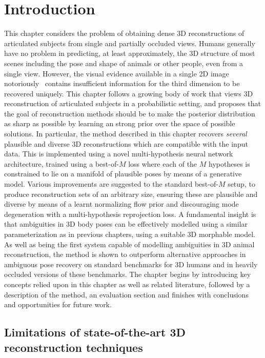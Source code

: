 \section{Introduction}\label{s:intro}

This chapter considers the problem of obtaining dense 3D reconstructions of articulated subjects from single and partially occluded views. Humans generally have no problem in predicting, at least approximately, the 3D structure of most scenes including the pose and shape of animals or other people, even from a single view.
However, the visual evidence available in a single 2D image notoriously~\citep{Faugeras01geometry} contains insufficient information for the third dimension to be recovered uniquely. 
This chapter follows a growing body of work that views 3D reconstruction of articulated subjects in a probabilistic setting, and proposes that the goal of reconstruction methods should be to make the posterior distribution as sharp as possible by learning an strong prior over the space of possible solutions. 
In particular, the method described in this chapter recovers \emph{several} plausible and diverse 3D reconstructions which are compatible with the input data. This is implemented using a novel multi-hypothesis neural network architecture, trained using a best-of-$M$ loss where each of the $M$ hypotheses is constrained to lie on a manifold of plausible poses by means of a generative model. Various improvements are suggested to the standard best-of-$M$ setup, to produce reconstruction sets of an arbitrary size, ensuring these are plausible and diverse by means of a learnt normalizing flow prior and discouraging mode degeneration with a multi-hypothesis reprojection loss.
A fundamental insight is that ambiguities in 3D body poses can be effectively modelled using a similar parameterization as in previous chapters, using a suitable 3D morphable model.
As well as being the first system capable of modelling ambiguities in 3D animal reconstruction, the method is shown to outperform alternative approaches in ambiguous pose recovery on standard benchmarks for 3D humans and in heavily occluded versions of these benchmarks. The chapter begins by introducing key concepts relied upon in this chapter as well as related literature, followed by a description of the method, an evaluation section and finishes with conclusions and opportunities for future work.



\subsection{Limitations of state-of-the-art 3D reconstruction techniques}


